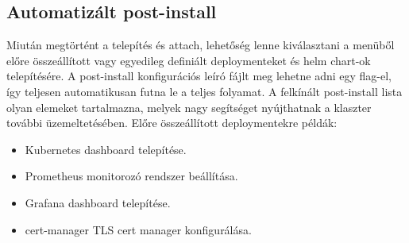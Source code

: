 \subsection{Automatizált post-install}
Miután megtörtént a telepítés és attach, lehetőség lenne kiválasztani a menüből előre összeállított vagy egyedileg definiált deploymenteket és helm chart-ok telepítésére.
A post-install konfigurációs leíró fájlt meg lehetne adni egy flag-el, így teljesen automatikusan futna le a teljes folyamat.
A felkínált post-install lista olyan elemeket tartalmazna, melyek nagy segítséget nyújthatnak a klaszter további üzemeltetésében.
Előre összeállított deploymentekre példák:
\begin{itemize}
    \item Kubernetes dashboard telepítése.
    \item Prometheus monitorozó rendszer beállítása.
    \item Grafana dashboard telepítése.
    \item cert-manager TLS cert manager konfigurálása.
\end{itemize}
